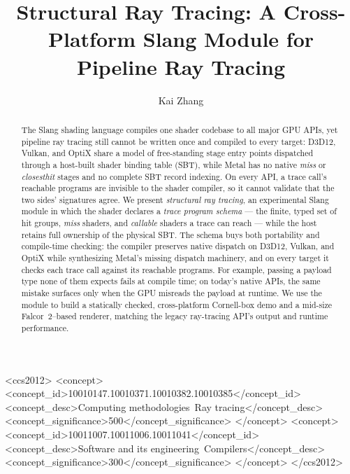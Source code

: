 \documentclass[sigconf,nonacm]{acmart}
\begin{document}
\title{Structural Ray Tracing: A Cross-Platform Slang Module for
Pipeline Ray Tracing}

\author{Kai Zhang}

\begin{abstract}
The Slang shading language compiles one shader codebase to all major
GPU APIs, yet pipeline ray tracing still cannot be written once and
compiled to every target: D3D12, Vulkan, and OptiX share a model of
free-standing stage entry points dispatched through a host-built shader
binding table (SBT), while Metal has no native \emph{miss} or
\emph{closesthit} stages and no complete SBT record indexing. On every API, a trace call's reachable
programs are invisible to the shader compiler, so it cannot validate
that the two sides' signatures agree. We present \emph{structural ray tracing}, an experimental
Slang module in which the shader
declares a \emph{trace program schema} --- the finite, typed set of hit
groups, \emph{miss} shaders, and \emph{callable} shaders a trace can
reach --- while
the host retains full ownership of the physical SBT. The schema buys both portability and
compile-time checking: the compiler preserves native dispatch on D3D12,
Vulkan, and OptiX while synthesizing Metal's missing dispatch machinery,
and on every target it checks each trace call against its reachable
programs. For example, passing a payload type none of them expects
fails at compile time; on today's native APIs, the same mistake
surfaces only when the GPU misreads the payload at runtime. We use the
module to build a statically checked, cross-platform Cornell-box demo
and a mid-size Falcor~2--based renderer, matching the legacy
ray-tracing API's output and runtime performance.
\end{abstract}

\begin{CCSXML}
<ccs2012>
<concept>
<concept_id>10010147.10010371.10010382.10010385</concept_id>
<concept_desc>Computing methodologies~Ray tracing</concept_desc>
<concept_significance>500</concept_significance>
</concept>
<concept>
<concept_id>10011007.10011006.10011041</concept_id>
<concept_desc>Software and its engineering~Compilers</concept_desc>
<concept_significance>300</concept_significance>
</concept>
</ccs2012>
\end{CCSXML}
\end{document}

